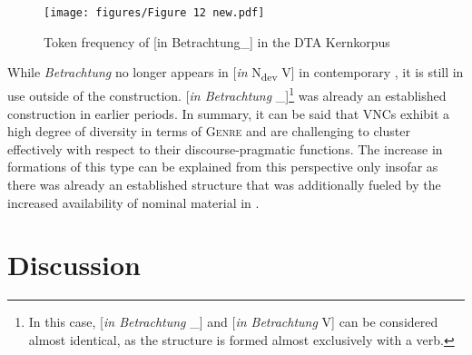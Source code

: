 \documentclass[output=paper,colorlinks,citecolor=brown]{langscibook}
\begin{document}
 \begin{figure}
     \texttt{[image: figures/Figure 12 new.pdf]}
     \caption{Token frequency of [in Betrachtung\_\textup{] in the DTA Kernkorpus}}
     \label{fig:fleissner:12}
 \end{figure}
\clearpage
While \textit{Betrachtung} no longer appears in [\textit{in} N\textsubscript{dev} V] in contemporary , it is still in use outside of the construction. [\textit{in Betrachtung} \_]\footnote{In this case, [\textit{in Betrachtung} \_] and [\textit{in Betrachtung} V] can be considered almost identical, as the structure is formed almost exclusively with a verb.} was already an established construction in earlier periods. In summary, it can be said that VNCs exhibit a high degree of diversity in terms of \textsc{Genre} and are challenging to cluster effectively with respect to their discourse-pragmatic functions. The increase in formations of this type can be explained from this perspective only insofar as there was already an established structure that was additionally fueled by the increased availability of nominal material in . 


\section{Discussion}\label{sec:fleissner:5}
\end{document}
